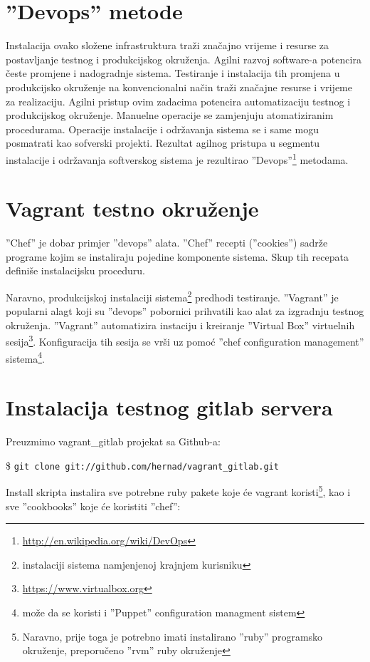 \documentclass[times, utf8, seminar]{fit}
\begin{document}
\section{''Devops'' metode}
Instalacija ovako složene infrastruktura traži značajno vrijeme i resurse za postavljanje testnog i produkcijskog okruženja. 
Agilni razvoj software-a potencira česte promjene i nadogradnje sistema. Testiranje i instalacija tih promjena u produkcijsko okruženje na konvencionalni način traži značajne resurse i vrijeme za realizaciju. Agilni pristup ovim zadacima potencira automatizaciju testnog i produkcijskog okruženje. Manuelne operacije se zamjenjuju atomatiziranim procedurama. Operacije instalacije i održavanja sistema se i same mogu posmatrati kao sofverski projekti.
Rezultat agilnog pristupa u segmentu instalacije i održavanja softverskog sistema je rezultirao ''Devops''\footnote{\url{http://en.wikipedia.org/wiki/DevOps}} metodama.

\section{Vagrant testno okruženje}

''Chef'' je dobar primjer ''devops'' alata. ''Chef'' recepti (''cookies'') sadrže programe kojim se instaliraju pojedine komponente sistema. Skup tih recepata definiše instalacijsku proceduru.

Naravno, produkcijskoj instalaciji sistema\footnote{instalaciji sistema namjenjenoj krajnjem kurisniku} predhodi testiranje.
''Vagrant'' je popularni alagt koji su ''devops'' pobornici prihvatili kao alat za izgradnju testnog okruženja. 
''Vagrant'' automatizira instaciju i kreiranje ''Virtual Box'' virtuelnih sesija\footnote{\url{https://www.virtualbox.org}}. Konfiguracija tih sesija se vrši uz pomoć ''chef configuration management'' sistema\footnote{može da se koristi i ''Puppet'' configuration managment sistem}.

\section{Instalacija testnog gitlab servera}

Preuzmimo vagrant\_gitlab projekat sa Github-a:

\$ \verb+git clone git://github.com/hernad/vagrant_gitlab.git+

Install skripta instalira sve potrebne ruby pakete koje će vagrant koristi\footnote{Naravno, prije toga je potrebno imati instalirano ''ruby'' programsko okruženje, preporučeno ''rvm'' ruby okruženje}, kao i sve ''cookbooks'' koje će koristiti ''chef'':
\end{document}
